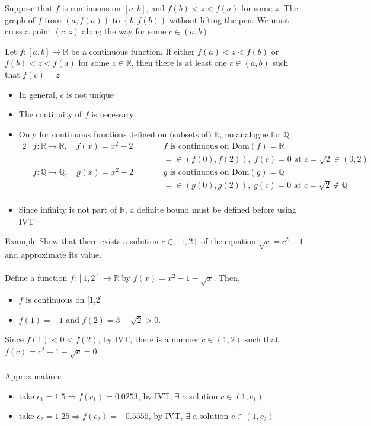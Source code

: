 \documentclass{report}
\begin{document}
	Suppose that $f$ is continuous on $[a,b]$, and $f(b) < z < f(a)$ for some $z$. The graph of $f$ from $(a, f(a))$ to $(b, f(b))$ without lifting the pen. We must cross a point $(c,z)$ along the way for some $c \in (a,b)$.

	Let $f: [a,b] \rightarrow \mathbb{R}$ be a continuous function. If either $f(a) < z < f(b)$ or $f(b) < z < f(a)$ for some $z \in \mathbb{R}$, then there is at least one $c \in (a,b)$ such that $f(c) = z$

	\begin{itemize}
		\item In general, $c$ is not unique
		\item The continuity of $f$ is necessary
		\item Only for continuous functions defined on (subsets of) $\mathbb{R}$, no analogue for $\mathbb{Q}$
			\begin{alignat*}{2}
				& f: \mathbb{R} \rightarrow \mathbb{R}, \quad f(x) = x^2 - 2 \qquad && f \text{ is continuous on Dom}(f) = \mathbb{R}	\\
				&																	&& = \in \left(f(0),f(2)\right),\;f(c) = 0 \text{ at } c = \sqrt{2} \in (0,2)	\\
				& f: \mathbb{Q} \rightarrow \mathbb{Q}, \quad g(x) = x^2 - 2 \qquad && g \text{ is continuous on Dom}(g) = \mathbb{Q}	\\
				&																	&& = \in \left(g(0),g(2)\right),\;g(c) = 0 \text{ at } c = \sqrt{2} \notin \mathbb{Q}	\\
			\end{alignat*}
		\item Since infinity is not part of $\mathbb{R}$, a definite bound must be defined before using IVT
	\end{itemize}

	\begin{question}{Example}
		Show that there exists a solution $c \in [1,2]$ of the equation $\sqrt{c} = c^2 - 1$ and approximate its value.
		\\ \\
		Define a function $f: [1,2] \rightarrow \mathbb{R}$ by $f(x) = x^2 - 1 - \sqrt{x}$. Then,
			\begin{itemize}
				\item $f$ is continuous on [1,2]
				\item $f(1) = -1$  and $f(2) = 3 - \sqrt{2} > 0$.
			\end{itemize}

		Since $f(1) < 0 < f(2)$, by \textcolor{pastel_orange}{IVT}, there is a number $c \in (1,2)$ such that $f(c) = c^2 - 1 - \sqrt{c} = 0$
		\\ \\
		Approximation:
		\begin{itemize}
			\item take $c_1 = 1.5 \Rightarrow f(c_1) = 0.0253$, by IVT, $\exists$ a solution $c \in (1, c_1)$
			\item take $c_2 = 1.25 \Rightarrow f(c_2) = -0.5555$, by IVT, $\exists$ a solution $c \in (1, c_2)$
		\end{itemize}

	\end{question}
\end{document}
